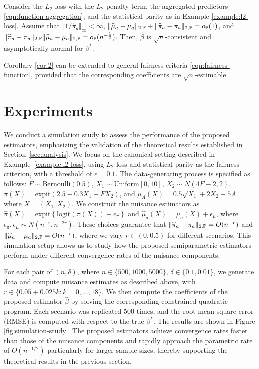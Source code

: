 \begin{corollary} \label{cor:2}
    Consider the $L_2$ loss with the $L_2$ penalty term, the aggregated predictors \eqref{eqn:function-aggregation}, and the statistical parity as in Example \ref{example:l2-loss}. Assume that $\Vert 1/\widehat{\pi}_a \Vert_\infty < \infty$,  $\Vert \widehat{\mu}_{a}- \mu_{a} \Vert_{2,\mathbb{P}} + \Vert \widehat{\pi}_{a}- \pi_{a} \Vert_{2,\mathbb{P}} = o_{\mathbb{P}}(1)$, and $\Vert \widehat{\pi}_{a} - {\pi}_{a} \Vert_{2,\mathbb{P}} \Vert \widehat{\mu}_{a} - \mu_{a} \Vert_{2,\mathbb{P}} = o_{\mathbb{P}}(n^{-\frac{1}{2}})$. Then, $\widehat{\beta}$ is $\sqrt{n}$-consistent and asymptotically normal for $\beta^*$.     
\end{corollary}
Corollary \ref{cor:2} can be extended to general fairness criteria \eqref{eqn:fairness-function}, provided that the corresponding coefficients are $\sqrt{n}$-estimable.


\section{Experiments} \label{sec:experiments}
We conduct a simulation study to assess the performance of the proposed estimators, emphasizing the validation of the theoretical results established in Section~\ref{sec:analysis}. We focus on the canonical setting described in Example~\ref{example:l2-loss}, using $L_2$ loss and statistical parity as the fairness criterion, with a threshold of $\epsilon=0.1$. The data-generating process is specified as follows: $F \sim \text{Bernoulli}(0.5)$, $X_1 \sim \text{Uniform}[0, 10]$, $X_2 \sim N(4F-2,2)$, $\pi(X) = \text{expit}(2.5-0.3X_1-FX_2)$, and $\mu_A(X)=0.5\sqrt{X_1}+2X_2-5A$ where $X=(X_1,X_2)$. We construct the nuisance estimators as $\widehat{\pi}(X)=\text{expit}\left\{\text{logit}(\pi(X))+\epsilon_\pi \right\}$ and $\widehat{\mu}_a(X) = \mu_a(X)+\epsilon_\mu$, where $\epsilon_\pi, \epsilon_\mu \sim N(n^{-r}, n^{-2r})$. These choices guarantee that $\Vert \widehat{\pi}_a - \pi_a \Vert_{2,\mathbb{P}}=O(n^{-r})$ and $\Vert \widehat{\mu}_a - \mu_a \Vert_{2,\mathbb{P}}=O(n^{-r})$, where we vary $r \in (0,0.5)$ for different scenarios. This simulation setup allows us to study how the proposed semiparametric estimators perform under different convergence rates of the nuisance components. 

For each pair of $(n,\delta)$, where $n\in\{500, 1000, 5000\}$, $\delta \in \{0.1, 0.01\}$, we generate data and compute nuisance estimates as described above, with $r \in \{0.05 + 0.025k: k=0,\ldots,18\}$. We then compute the coefficients of the proposed estimator $\widehat{\beta}$ by solving the corresponding constrained quadratic program. Each scenario was replicated $500$ times, and the root-mean-square error (RMSE) is computed with respect to the true $\beta^*$. The results are shown in Figure \ref{fig:simulation-study}. The proposed estimators achieve convergence rates faster than those of the nuisance components and rapidly approach the parametric rate of $O(n^{-1/2})$ particularly for larger sample sizes, thereby supporting the theoretical results in the previous section.

